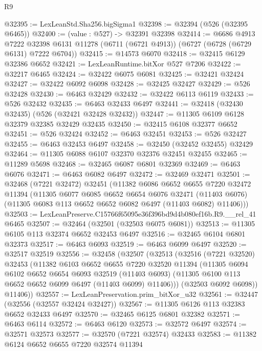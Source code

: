 \begin{lexlean}{R9}
\begin{coremodule}
@32395 := LexLeanStd.Sha256.bigSigma1
@32398 := @32394 (@526 (@32395 @6465))
@32400 := (value : @527) -> @32391 @32398
@32414 := @6686
    @4913
    @7222
    @32398
    @6131
    @11278
    (@6711 (@6721 @4913))
    (@6727 (@6728 (@6729 @6131) @7222 @6704))
@32415 := @14573 @6070
@32418 := @32415 @6129 @32386 @6652
@32421 := LexLeanRuntime.bitXor @527 @7206
@32422 := @32217 @6465
@32424 := @32422 @6075 @6081
@32425 := @32421 @32424
@32427 := @32422 @6092 @6098
@32428 := @32425 @32427
@32429 := @526 @32428
@32430 := @6463 @32429
@32432 := @32422 @6113 @6119
@32433 := @526 @32432
@32435 := @6463 @32433 @6497
@32441 := @32418 (@32430 @32435) (@526 (@32421 @32428 @32432))
@32447 := @11305 @6109 @6128 @32379 @32385 @32429 @32435
@32450 := @32415 @6108 @32377 @6652
@32451 := @526 @32424
@32452 := @6463 @32451
@32453 := @526 @32427
@32455 := @6463 @32453 @6497
@32458 := @32450 (@32452 @32455) @32429
@32464 := @11305 @6088 @6107 @32370 @32376 @32451 @32455
@32465 := @11289 @5698
@32468 := @32465 @6087 @6801 @32369
@32469 := @6463 @6076
@32471 := @6463 @6082 @6497
@32472 := @32469 @32471
@32501 := @32468
    (@7221 @32472)
    @32451
    (@11382
      @6086
      @6652
      @6655
      @7220
      @32472
      @11394
      (@11305
        @6077
        @6085
        @6652
        @6654
        @6076
        @32471
        (@11403 @6076)
        (@11305 @6083 @113 @6652 @6652 @6082 @6497 (@11403 @6082) @11406)))
@32503 := LexLeanPreserve.C15766f65095e36f396bd9d4b080ef16b.R9.__rel_41 @6465
@32507 := @32464 (@32501 (@32503 @6075 @6081))
@32513 := @11305 @6105 @113 @32374 @6652 @32453 @6497
@32516 := @32465 @6104 @6801 @32373
@32517 := @6463 @6093
@32519 := @6463 @6099 @6497
@32520 := @32517 @32519
@32556 := @32458
    (@32507
      (@32513
        (@32516
          (@7221 @32520)
          @32453
          (@11382
            @6103
            @6652
            @6655
            @7220
            @32520
            @11394
            (@11305
              @6094
              @6102
              @6652
              @6654
              @6093
              @32519
              (@11403 @6093)
              (@11305 @6100 @113 @6652 @6652 @6099 @6497 (@11403 @6099) @11406)))
          (@32503 @6092 @6098))
        @11406))
@32557 := LexLeanPreservation.prim_bitXor_u32
@32561 := @32447 (@32556 (@32557 @32424 @32427))
@32567 := @11305 @6126 @113 @32383 @6652 @32433 @6497
@32570 := @32465 @6125 @6801 @32382
@32571 := @6463 @6114
@32572 := @6463 @6120
@32573 := @32572 @6497
@32574 := @32571 @32573
@32577 := @32570 (@7221 @32574) @32433
@32583 := @11382 @6124 @6652 @6655 @7220 @32574 @11394

\end{coremodule}
\end{lexlean}

